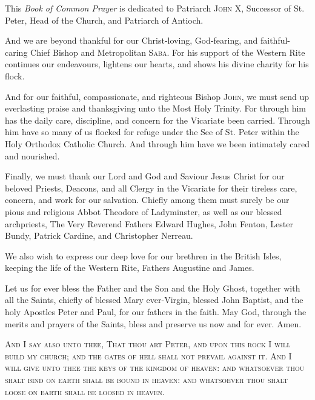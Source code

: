 {}
\noindent
This \textit{Book of Common Prayer} is dedicated to Patriarch \textsc{John X},  Successor of St. Peter, Head of the Church, and Patriarch of Antioch.\\
\par\noindent
And we are beyond thankful for our Christ-loving, God-fearing, and faithful-caring Chief Bishop and Metropolitan \textsc{Saba}. For his support of the Western Rite continues our endeavours, lightens our hearts, and shows his divine charity for his flock.\\
\par\noindent
And for our faithful, compassionate, and righteous Bishop \textsc{John}, we must send up everlasting praise and thanksgiving unto the Most Holy Trinity. For through him has the daily care, discipline, and concern for the Vicariate been carried. Through him have so many of us flocked for refuge under the See of St. Peter within the Holy Orthodox Catholic Church. And through him have we been intimately cared and nourished.\\
\par\noindent
Finally, we must thank our Lord and God and Saviour Jesus Christ for our beloved Priests, Deacons, and all Clergy in the Vicariate for their tireless care, concern, and work for our salvation. Chiefly among them must surely be our pious and religious Abbot Theodore of Ladyminster, as well as our blessed archpriests, The Very Reverend Fathers Edward Hughes, John Fenton, Lester Bundy, Patrick Cardine, and Christopher Nerreau.\\
\par\noindent
We also wish to express our deep love for our brethren in the British Isles, keeping the life of the Western Rite, Fathers Augustine and James.\\
\par\noindent
Let us for ever bless the Father and the Son and the Holy Ghost, together with all the Saints, chiefly of blessed Mary ever-Virgin, blessed John Baptist, and the holy Apostles Peter and Paul, for our fathers in the faith. May God, through the merits and prayers of the Saints, bless and preserve us now and for ever. Amen.
\vfill
\begin{center}
\textsc{And I say also unto thee, That thou art Peter, and upon this rock I will build my church; and the gates of hell shall not prevail against it. And I will give unto thee the keys of the kingdom of heaven: and whatsoever thou shalt bind on earth shall be bound in heaven: and whatsoever thou shalt loose on earth shall be loosed in heaven.}
\end{center}